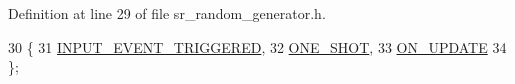 Definition at line 29 of file sr\+\_\+random\+\_\+generator.\+h.


\begin{DoxyCode}
30 \{
31     \hyperlink{namespacesmacc_1_1state__reactors_a038f8e362ad6d35494c940ee4c97a52eab75323a08fc093fa69e7a6aceb681611}{INPUT\_EVENT\_TRIGGERED},
32     \hyperlink{namespacesmacc_1_1state__reactors_a038f8e362ad6d35494c940ee4c97a52ea5bc2964599423c796ecf0aaecdc5be9d}{ONE\_SHOT},
33     \hyperlink{namespacesmacc_1_1state__reactors_a038f8e362ad6d35494c940ee4c97a52ea4a6be4c8602d150038b100a35556d3d7}{ON\_UPDATE}
34 \};
\end{DoxyCode}
